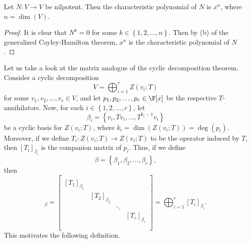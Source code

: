 \documentclass[math_245.tex]{subfiles}
\begin{document}
    \begin{cor}{}
        Let $N:V\to V$ be nilpotent. Then the characteristic polynomial of $N$ is $x^n$, where $n=\dim(V)$.
    \end{cor}	

    \begin{proof}
        It is clear that $N^k=0$ for some $k\in\left\lbrace 1,2,\ldots,n \right\rbrace $. Then by (b) of the generalized Cayley-Hamilton theorem, $x^n$ is the characteristic polynomial of $N$.
    \end{proof}
    
    \begin{remark}
        Let us take a look at the matrix analogue of the cyclic decomposition theorem. Consider a cyclic decomposition
        \begin{equation*}
            V = \bigoplus^{r}_{i=1} Z\left( v_i;T \right) 
        \end{equation*}
        for some $v_1,v_2,\ldots,v_r\in V$, and let $p_1,p_2,\ldots,p_r\in\F[x]$ be the respective $T$-annihilators. Now, for each $i\in \left\lbrace 1,2,\ldots,r \right\rbrace $, let
        \begin{equation*}
            \beta_i = \left\lbrace v_i, Tv_i, \ldots, T^{k_i-1}v_i \right\rbrace 
        \end{equation*}
        be a cyclic basis for $Z\left( v_i;T \right)$, where $k_i=\dim\left( Z\left( v_i;T \right)  \right) = \deg\left( p_i \right)$. Moreover, if we define $T_i:Z\left( v_i;T \right) \to Z\left( v_i;T \right)$ to be the operator induced by $T$, then $\left[ T_i \right] _{\beta_i}$ is the companion matrix of $p_i$. Thus, if we define
        \begin{equation*}
            \beta = \left\lbrace \beta_1,\beta_2, \ldots,\beta_r \right\rbrace ,
        \end{equation*}
        then
        \begin{equation*}
            [T]_\beta = 
            \begin{bmatrix}
                & & & \\
                \left[ T_1 \right]_{\beta_1} & & & \\
                & \left[ T_2 \right]_{\beta_2} & & \\
                & & \ddots & \\
                & & & \left[ T_r \right]_{\beta_r}\\
                & & & \\
            \end{bmatrix}
            = \bigoplus^{r}_{i=1} \left[ T_i \right] _{\beta_i}.
        \end{equation*}
        This motivates the following definition.
    \end{remark}
\end{document}
